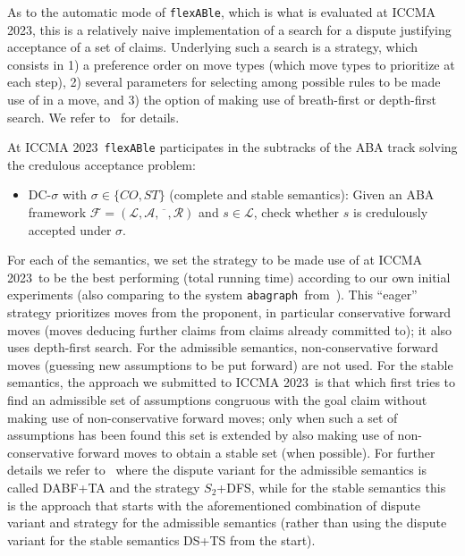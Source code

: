 \documentclass[conference]{IEEEtran}
\newcommand{\flexable}{\texttt{flexABle}\xspace}
\newcommand{\abagraph}{\texttt{abagraph}\xspace}
\newcommand{\iccma}{ICCMA 2023}
\newcommand{\frF}{\ensuremath{\mathcal{F}}\xspace}
\newcommand{\frL}{\ensuremath{\mathcal{L}}\xspace}
\newcommand{\frA}{\ensuremath{\mathcal{A}}\xspace}
\newcommand{\frCtr}{\ensuremath{\overline{\phantom{x}}}\xspace}
\newcommand{\frR}{\ensuremath{\mathcal{R}}\xspace}
\newcommand{\frTup}{\ensuremath{(\frL,\frA,\frCtr,\frR)}\xspace}
\newcommand{\fr}{\ensuremath{\frF = \frTup}\xspace}
\begin{document}
As to the automatic mode of \flexable, which is what is evaluated at \iccma, this is a relatively naive implementation of a search for a dispute justifying acceptance of a set of claims.  Underlying such a search is a strategy, which consists in 1) a preference order on move types (which move types to prioritize at each step), 2) several parameters for selecting among possible rules to be made use of in a move, and 3) the option of making use of breath-first or depth-first search.  We refer to~\cite{DiGaGo22,gor22} for details.

At \iccma~\flexable participates in the subtracks of the ABA track solving the credulous acceptance problem:

\begin{itemize}
\item DC-$\sigma$ with $\sigma \in \{CO, ST\}$ (complete and stable semantics): Given an ABA framework \fr and $s \in \frL$, check whether $s$ is credulously accepted under $\sigma$.
\end{itemize}

\noindent For each of the semantics, we set the strategy to be made use of at \iccma~to be the best performing (total running time) according to our own initial experiments (also comparing to the system \abagraph~from~\cite{CravenT16}).  This ``eager'' strategy prioritizes moves from the proponent, in particular conservative forward moves (moves deducing further claims from claims already committed to); it also uses depth-first search.  For the admissible semantics, non-conservative forward moves (guessing new assumptions to be put forward) are not used. For the stable semantics, the approach we submitted to \iccma~is that which first tries to find an admissible set of assumptions congruous with the goal claim without making use of non-conservative forward moves; only when such a set of assumptions has been found this set is extended by also making use of non-conservative forward moves to obtain a stable set (when possible).  For further details we refer to~\cite{DiGaGo22,gor22} where the dispute variant for the admissible semantics is called DABF+TA and the strategy $S_2$+DFS, while for the stable semantics this is the approach that starts with the aforementioned combination of dispute variant and strategy for the admissible semantics (rather than using the dispute variant for the stable semantics DS+TS from the start).          

 









%
%
\end{document}
